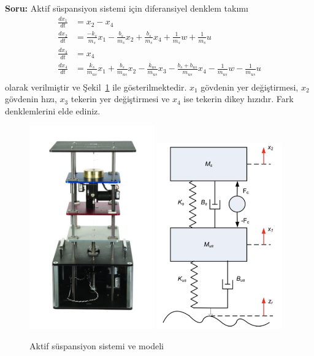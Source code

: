 \noindent\textbf{Soru:} Aktif süspansiyon sistemi için diferansiyel denklem takımı 
\begin{equation}
\begin{split}
    \frac{dx_1}{dt}&=x_2-x_4\\
    \frac{dx_2}{dt}&=\frac{-k_s}{m_s}x_1-\frac{b_s}{m_s}x_2+\frac{b_s}{m_s}x_4+\frac{1}{m_s}w+\frac{1}{m_s}u\\
    \frac{dx_3}{dt}&=x_4\\
    \frac{dx_4}{dt}&=\frac{k_s}{m_{us}}x_1+\frac{b_s}{m_{us}}x_2-\frac{k_{us}}{m_{us}}x_3-\frac{b_s+b_{us}}{m_{us}}x_4-\frac{1}{m_{us}}w-\frac{1}{m_{us}}u\\
\end{split}
\end{equation}
olarak verilmiştir ve Şekil~\ref{fig:suspension} ile gösterilmektedir. $x_1$ gövdenin yer değiştirmesi, $x_2$ gövdenin hızı, $x_3$ tekerin yer değiştirmesi ve $x_4$ ise tekerin dikey hızıdır. Fark denklemlerini elde ediniz.
\begin{figure}[!htb]
    \centering
    \includegraphics[width=0.48\textwidth]{lab}
    \includegraphics[width=0.48\textwidth]{suspension}
    \caption{Aktif süspansiyon sistemi ve modeli}\label{fig:suspension}
\end{figure}
